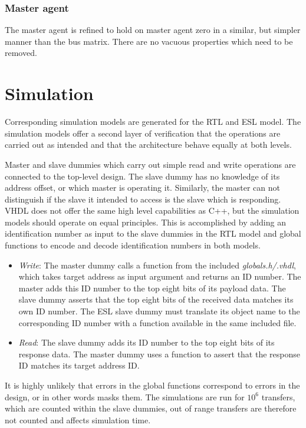 \subsubsection{Master agent}
The master agent is refined to hold on master agent zero in a similar, but simpler manner than the bus matrix. There are no vacuous properties which need to be removed. 



\section{Simulation}
\label{sec:sim}
Corresponding simulation models are generated for the RTL and ESL model. The simulation models offer a second layer of verification that the operations are carried out as intended and that the architecture behave equally at both levels. \par
Master and slave dummies which carry out simple read and write operations are connected to the top-level design. The slave dummy has no knowledge of its address offset, or which master is operating it. Similarly, the master can not distinguish if the slave it intended to access is the slave which is responding. VHDL does not offer the same high level capabilities as C++, but the simulation models should operate on equal principles. This is accomplished by adding an identification number as input to the slave dummies in the RTL model and global functions to encode and decode identification numbers in both models. 
\begin{itemize}
 \item \textit{Write}: The master dummy calls a function from the included \textit{globals.h/.vhdl}, which takes target address as input argument and returns an ID number. The master adds this ID number to the top eight bits of its payload data. The slave dummy asserts that the top eight bits of the received data matches its own ID number. The ESL slave dummy must translate its object name to the corresponding ID number with a function available in the same included file. 
 \item \textit{Read}: The slave dummy adds its ID number to the top eight bits of its response data. The master dummy uses a function to assert that the response ID matches its target address ID.   
\end{itemize}  

It is highly unlikely that errors in the global functions correspond to errors in the design, or in other words masks them. The simulations are run for $10^6$ transfers, which are counted within the slave dummies, out of range transfers are therefore not counted and affects simulation time.  

